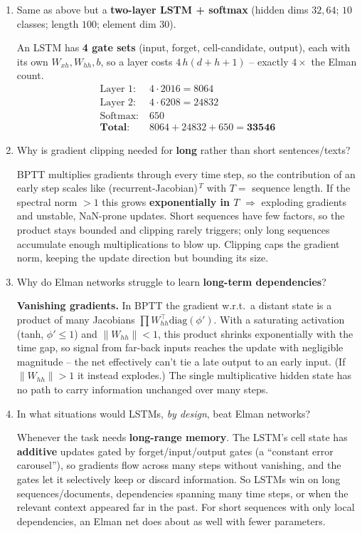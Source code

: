 \documentclass[10pt,a4paper]{article}
\newcommand{\q}[1]{\item #1}
\begin{document}
\begin{enumerate}[leftmargin=*,label=\textbf{Q\arabic*.}]
\q Same as above but a \textbf{two-layer LSTM + softmax} (hidden dims $32,64$; $10$ classes; length $100$; element dim $30$).
\begin{answerbox}
An LSTM has \textbf{4 gate sets} (input, forget, cell-candidate, output), each with its own $W_{xh},W_{hh},b$, so a layer costs $4\,h(d+h+1)$ -- exactly $4\times$ the Elman count.
\[
\begin{aligned}
\text{Layer 1}:\;& 4\cdot 2016 = 8064\\
\text{Layer 2}:\;& 4\cdot 6208 = 24832\\
\text{Softmax}:\;& 650\\
\hline
\textbf{Total}:\;& 8064+24832+650 = \mathbf{33546}
\end{aligned}
\]
\end{answerbox}

\q Why is gradient clipping needed for \textbf{long} rather than short sentences/texts?
\begin{answerbox}
BPTT multiplies gradients through every time step, so the contribution of an early step scales like (recurrent-Jacobian)$^{\,T}$ with $T=$ sequence length. If the spectral norm $>1$ this grows \textbf{exponentially in $T$} $\Rightarrow$ exploding gradients and unstable, NaN-prone updates. Short sequences have few factors, so the product stays bounded and clipping rarely triggers; only long sequences accumulate enough multiplications to blow up. Clipping caps the gradient norm, keeping the update direction but bounding its size.
\end{answerbox}

\q Why do Elman networks struggle to learn \textbf{long-term dependencies}?
\begin{answerbox}
\textbf{Vanishing gradients.} In BPTT the gradient w.r.t.\ a distant state is a product of many Jacobians $\prod W_{hh}^\top \mathrm{diag}(\phi')$. With a saturating activation (tanh, $\phi'\le 1$) and $\|W_{hh}\|<1$, this product shrinks exponentially with the time gap, so signal from far-back inputs reaches the update with negligible magnitude -- the net effectively can't tie a late output to an early input. (If $\|W_{hh}\|>1$ it instead explodes.) The single multiplicative hidden state has no path to carry information unchanged over many steps.
\end{answerbox}

\q In what situations would LSTMs, \emph{by design}, beat Elman networks?
\begin{answerbox}
Whenever the task needs \textbf{long-range memory}. The LSTM's cell state has \textbf{additive} updates gated by forget/input/output gates (a ``constant error carousel''), so gradients flow across many steps without vanishing, and the gates let it selectively keep or discard information. So LSTMs win on long sequences/documents, dependencies spanning many time steps, or when the relevant context appeared far in the past. For short sequences with only local dependencies, an Elman net does about as well with fewer parameters.
\end{answerbox}


\end{enumerate}
\end{document}
